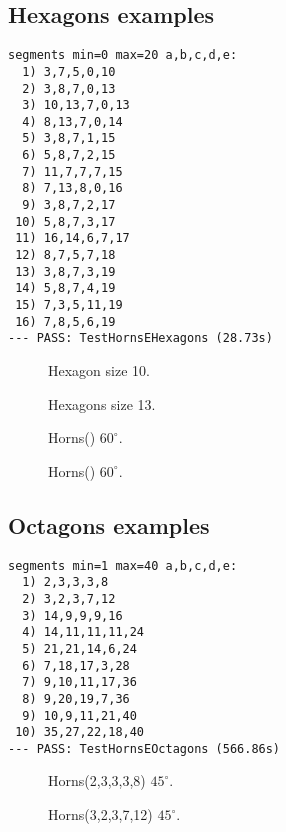 \documentclass[11pt]{article}
\begin{document}
\subsection{Hexagons examples}

\begin{lstlisting}
segments min=0 max=20 a,b,c,d,e:
  1) 3,7,5,0,10
  2) 3,8,7,0,13
  3) 10,13,7,0,13
  4) 8,13,7,0,14
  5) 3,8,7,1,15
  6) 5,8,7,2,15
  7) 11,7,7,7,15
  8) 7,13,8,0,16
  9) 3,8,7,2,17
 10) 5,8,7,3,17
 11) 16,14,6,7,17
 12) 8,7,5,7,18
 13) 3,8,7,3,19
 14) 5,8,7,4,19
 15) 7,3,5,11,19
 16) 7,8,5,6,19
--- PASS: TestHornsEHexagons (28.73s)
\end{lstlisting}

\begin{figure}[H]
\centering
{}
\caption{Hexagon size 10.}
\end{figure}

\begin{figure}[H]
\centering
{}
\caption{Hexagons size 13.}
\end{figure}




\begin{figure}[H]
\centering
{}
\caption{Horns() $60^\circ$.}
\end{figure}

\begin{figure}[H]
\centering
{}
\caption{Horns() $60^\circ$.}
\end{figure}




\subsection{Octagons examples}

\begin{lstlisting}
segments min=1 max=40 a,b,c,d,e:
  1) 2,3,3,3,8
  2) 3,2,3,7,12
  3) 14,9,9,9,16
  4) 14,11,11,11,24
  5) 21,21,14,6,24
  6) 7,18,17,3,28
  7) 9,10,11,17,36
  8) 9,20,19,7,36
  9) 10,9,11,21,40
 10) 35,27,22,18,40
--- PASS: TestHornsEOctagons (566.86s)
\end{lstlisting}

\setlength{\columnsep}{2pt}
\begin{multicols}{1}

\begin{figure}[H]
\centering
{}
\caption{Horns(2,3,3,3,8) $45^\circ$.}
\end{figure}

\begin{figure}[H]
\centering
{}
\caption{Horns(3,2,3,7,12) $45^\circ$.}
\end{figure}

\end{multicols}
\end{document}
